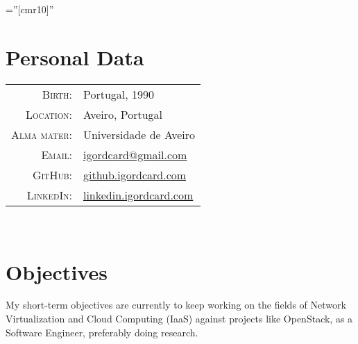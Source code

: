 \documentclass[a4paper,10pt]{article} %
\begin{document}
\pagestyle{empty} %

\font\fb=''[cmr10]'' %



\par{\bigskip\par} %

\section{Personal Data}

\begin{tabular}{rl}
\textsc{Birth:} & Portugal, 1990 \\
\textsc{Location:} & Aveiro, Portugal \\
\textsc{Alma mater:} & Universidade de Aveiro\\
\textsc{Email:} & \href{mailto:igordcard+cv@gmail.com}{igordcard@gmail.com}\\
\textsc{GitHub:} & \href{http://github.igordcard.com}{github.igordcard.com}\\
\textsc{LinkedIn:} & \href{http://linkedin.igordcard.com}{linkedin.igordcard.com}\\
\end{tabular} \\


\section{Objectives}

My short-term objectives are currently to keep working on the fields of Network Virtualization and Cloud Computing (IaaS) against projects like OpenStack, as a Software Engineer, preferably doing research.
\end{document}
